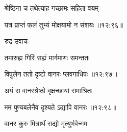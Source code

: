 {\devanagarifont श्रेष्ठिना च तथेत्याह गच्छामः सहिता वयम् \thinspace{\dandab} \dontdisplaylinenum }%


{\devanagarifont यत्र प्राप्तं फलं तुभ्यं मोक्षयामो न संशयः {॥१२:९६॥} \veg\dontdisplaylinenum }%

{\devanagarifont रुद्र उवाच {\dandab}\dontdisplaylinenum  }%
 
{\devanagarifont तमारुह्य गिरिं सह्यं मार्गमाणः समन्ततः \thinspace{\danda} \dontdisplaylinenum }%


{\devanagarifont विपुलेन ततो दृष्टो वानरः प्लवगाधिपः {॥१२:९७॥} \veg\dontdisplaylinenum }%

{\devanagarifont अयं स वानरश्रेष्ठो वृक्षच्छायां समाश्रितः \thinspace{\dandab} \dontdisplaylinenum }%


{\devanagarifont मम पुण्यबलेनैव दृश्यते ऽद्यापि वानरः {॥१२:९८॥} \veg\dontdisplaylinenum }%
 
{\devanagarifont वानर कुरु मित्रार्थं सद्यो मृत्युर्भवेन्मम \thinspace{\dandab} \dontdisplaylinenum }%


